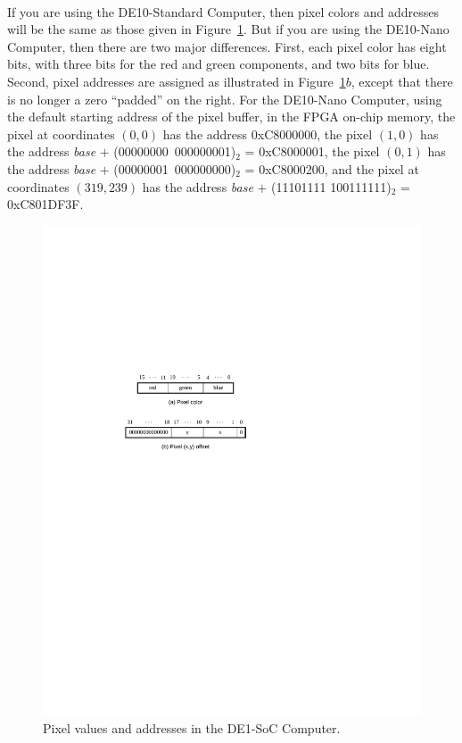 \documentclass[epsfig,10pt,fullpage]{article}
\begin{document}
~\\
\noindent
If you are using the DE10-Standard Computer, then pixel colors and addresses will be the same
as those given in Figure~\ref{fig:pixels}. But if you are using the DE10-Nano Computer,
then there are two major differences. First, each pixel color has eight bits, with three bits for
the red and green components, and two bits for blue. Second, pixel addresses are 
assigned as illustrated in Figure~\ref{fig:pixels}$b$, except that there is no longer a zero
``padded'' on the right. For the  DE10-Nano Computer, using the default starting address 
of the pixel buffer, in the 
FPGA on-chip memory, the pixel at coordinates $(0,0)$ has the address 
{\sf 0xC8000000}, the pixel $(1,0)$ 
has the address {\it base} $+$ (00000000~000000001)$_2$ = {\sf 0xC8000001}, the pixel $(0,1)$ 
has the address {\it base} $+$ (00000001~000000000)$_2$ = {\sf 0xC8000200}, and the pixel 
at coordinates $(319,239)$ has the address {\it base} $+$ (11101111 100111111)$_2$ =
{\sf 0xC801DF3F}. 

\begin{figure}[h!]
   \begin{center}
       \includegraphics{figures/fig_pixels.pdf}
   \end{center}
   \caption{Pixel values and addresses in the DE1-SoC Computer.}
	\label{fig:pixels}
\end{figure}
\end{document}
